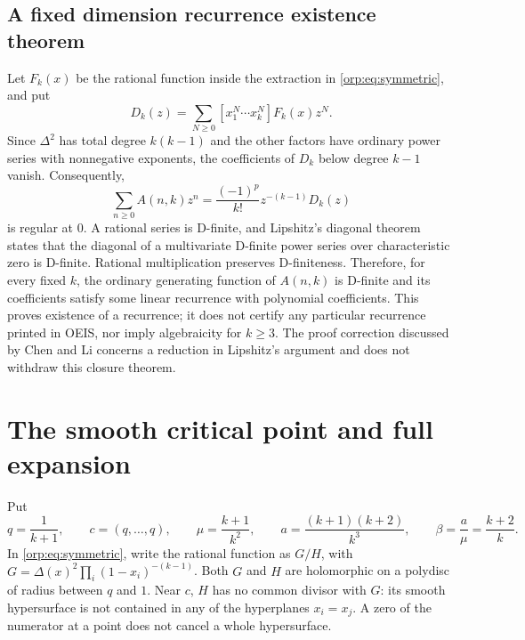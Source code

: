 \documentclass[11pt]{article}
\theoremstyle{remark}\newtheorem{remark}[theorem]{Remark}
\begin{document}
\subsection{A fixed dimension recurrence existence theorem}
Let $F_k(x)$ be the rational function inside the extraction in \eqref{orp:eq:symmetric}, and put
\[
 D_k(z)=\sum_{N\ge0}[x_1^N\cdots x_k^N]F_k(x)z^N.
\]
Since $\Delta^2$ has total degree $k(k-1)$ and the other factors have ordinary power series with nonnegative exponents, the coefficients of $D_k$ below degree $k-1$ vanish. Consequently,
\[
 \sum_{n\ge0}A(n,k)z^n=\frac{(-1)^p}{k!}z^{-(k-1)}D_k(z)
\]
is regular at $0$. A rational series is D-finite, and Lipshitz's diagonal theorem \cite{lipshitz} states that the diagonal of a multivariate D-finite power series over characteristic zero is D-finite. Rational multiplication preserves D-finiteness. Therefore, for every fixed $k$, the ordinary generating function of $A(n,k)$ is D-finite and its coefficients satisfy some linear recurrence with polynomial coefficients. This proves existence of a recurrence; it does not certify any particular recurrence printed in OEIS, nor imply algebraicity for $k\ge3$. The proof correction discussed by Chen and Li \cite{chenli} concerns a reduction in Lipshitz's argument and does not withdraw this closure theorem.


\section{The smooth critical point and full expansion}\label{orp:sec:smooth}
Put
\begin{equation}\label{orp:eq:qmu}
 q=\frac1{k+1},\qquad c=(q,\ldots,q),\qquad
 \mu=\frac{k+1}{k^2},\qquad
 a=\frac{(k+1)(k+2)}{k^3},\qquad \beta=\frac a\mu=\frac{k+2}{k}.
\end{equation}
In \eqref{orp:eq:symmetric}, write the rational function as $G/H$, with
$G=\Delta(x)^2\prod_i(1-x_i)^{-(k-1)}$. Both $G$ and $H$ are holomorphic on a polydisc of radius between $q$ and $1$. Near $c$, $H$ has no common divisor with $G$: its smooth hypersurface is not contained in any of the hyperplanes $x_i=x_j$. A zero of the numerator at a point does not cancel a whole hypersurface.
\end{document}
